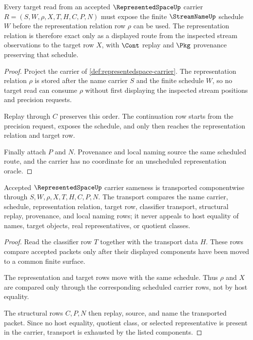 \begin{theorem}
\label{thm:representedspace-schedule-representation-exactness}
Every target read from an accepted $\RepresentedSpaceUp$ carrier $R=(S,W,\rho,X,T,H,C,P,N)$ must expose the finite $\StreamNameUp$ schedule $W$ before the representation relation row $\rho$ can be used. The representation relation is therefore exact only as a displayed route from the inspected stream observations to the target row $X$, with $\Cont$ replay and $\Pkg$ provenance preserving that schedule.
\end{theorem}
\begin{proof}
Project the carrier of \autoref{def:representedspace-carrier}. The representation relation $\rho$ is stored after the name carrier $S$ and the finite schedule $W$, so no target read can consume $\rho$ without first displaying the inspected stream positions and precision requests.

Replay through $C$ preserves this order. The continuation row starts from the precision request, exposes the schedule, and only then reaches the representation relation and target row.

Finally attach $P$ and $N$. Provenance and local naming source the same scheduled route, and the carrier has no coordinate for an unscheduled representation oracle.
\end{proof}

\begin{theorem}
\label{thm:representedspace-classifier-transport}
Accepted $\RepresentedSpaceUp$ carrier sameness is transported componentwise through $S,W,\rho,X,T,H,C,P,N$. The transport compares the name carrier, schedule, representation relation, target row, classifier transport, structural replay, provenance, and local naming rows; it never appeals to host equality of names, target objects, real representatives, or quotient classes.
\end{theorem}
\begin{proof}
Read the classifier row $T$ together with the transport data $H$. These rows compare accepted packets only after their displayed components have been moved to a common finite surface.

The representation and target rows move with the same schedule. Thus $\rho$ and $X$ are compared only through the corresponding scheduled carrier rows, not by host equality.

The structural rows $C,P,N$ then replay, source, and name the transported packet. Since no host equality, quotient class, or selected representative is present in the carrier, transport is exhausted by the listed components.
\end{proof}

